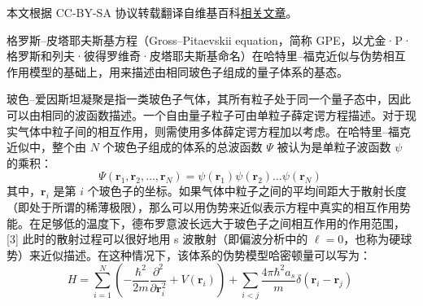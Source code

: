 
本文根据 CC-BY-SA 协议转载翻译自维基百科\href{https://en.wikipedia.org/wiki/Gross\%E2\%80\%93Pitaevskii_equation}{相关文章}。

格罗斯–皮塔耶夫斯基方程（Gross–Pitaevskii equation，简称 GPE，以尤金·P·格罗斯和列夫·彼得罗维奇·皮塔耶夫斯基命名）在哈特里–福克近似与伪势相互作用模型的基础上，用来描述由相同玻色子组成的量子体系的基态。

玻色–爱因斯坦凝聚是指一类玻色子气体，其所有粒子处于同一个量子态中，因此可以由相同的波函数描述。一个自由量子粒子可由单粒子薛定谔方程描述。对于现实气体中粒子间的相互作用，则需使用多体薛定谔方程加以考虑。在哈特里–福克近似中，整个由 $N$ 个玻色子组成的体系的总波函数 $\Psi$ 被认为是单粒子波函数 $\psi$ 的乘积：
$$
\Psi(\mathbf{r}_1, \mathbf{r}_2, \dots, \mathbf{r}_N) = \psi(\mathbf{r}_1)\psi(\mathbf{r}_2) \dots \psi(\mathbf{r}_N)~
$$
其中，$\mathbf{r}_i$ 是第 $i$ 个玻色子的坐标。如果气体中粒子之间的平均间距大于散射长度（即处于所谓的稀薄极限），那么可以用伪势来近似表示方程中真实的相互作用势能。在足够低的温度下，德布罗意波长远大于玻色子之间相互作用的作用范围，[3] 此时的散射过程可以很好地用 s 波散射（即偏波分析中的 $\ell = 0$，也称为硬球势）来近似描述。在这种情况下，该体系的伪势模型哈密顿量可以写为：
$$
H = \sum_{i=1}^{N} \left( -\frac{\hbar^2}{2m} \frac{\partial^2}{\partial \mathbf{r}_i^2} + V(\mathbf{r}_i) \right) + \sum_{i<j} \frac{4\pi \hbar^2 a_s}{m} \delta(\mathbf{r}_i - \mathbf{r}_j)~
$$

